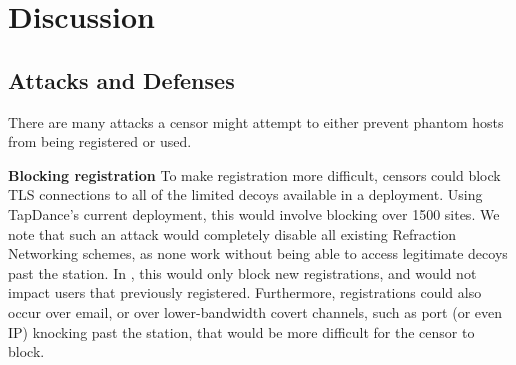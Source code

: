 \documentclass[letterpaper,twocolumn,10pt]{article}
\renewcommand{\paragraph}[1]{\smallskip\noindent\textbf{#1\quad}}
\begin{document}


\section{Discussion}


\subsection{Attacks and Defenses}
\label{sec:attacks}

There are many attacks a censor might attempt to either prevent phantom hosts from
being registered or used.

\paragraph{Blocking registration}
To make registration more difficult, censors could block TLS connections to all of the
limited decoys available in a deployment. Using TapDance's current deployment,
this would involve blocking over 1500 sites. We note that such an attack would
completely disable all existing Refraction Networking schemes, as none work
without being able to access legitimate decoys past the station. In \scheme,
this would only block new registrations, and would not impact users that
previously registered. Furthermore, registrations could also occur over email,
or over lower-bandwidth covert channels, such as port (or even IP) knocking past
the station, that would be more difficult for the censor to block.
\end{document}
